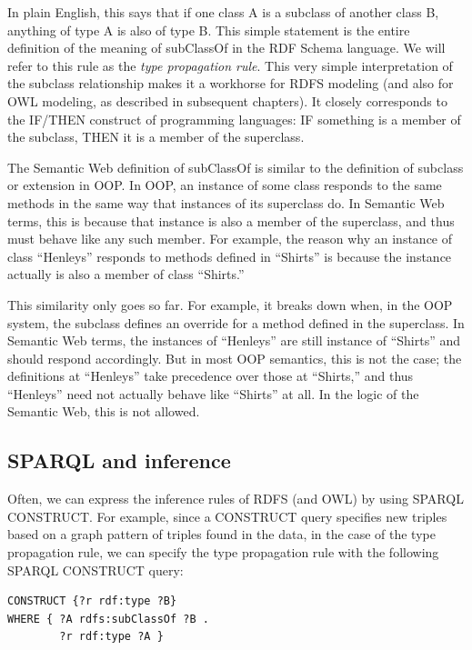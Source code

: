 In plain English, this says that if one class A is a subclass of another
class B, anything of type A is also of type B. This simple statement is
the entire definition of the meaning of subClassOf in the RDF Schema
language. We will refer to this rule as the \emph{type propagation
rule}. This very simple interpretation of the subclass relationship
makes it a workhorse for RDFS modeling (and also for OWL modeling, as
described in subsequent chapters). It closely corresponds to the IF/THEN
construct of programming languages: IF something is a member of the
subclass, THEN it is a member of the superclass.

\begin{sidebar}{}
The Semantic Web definition of subClassOf is similar to the definition
of subclass or extension in OOP. In OOP, an instance of some class
responds to the same methods in the same way that instances of its
superclass do. In Semantic Web terms, this is because that instance is
also a member of the superclass, and thus must behave like any such
member. For example, the reason why an instance of class ``Henleys''
responds to methods defined in ``Shirts'' is because the instance
actually is also a member of class ``Shirts.''

This similarity only goes so far. For example, it breaks down when, in
the OOP system, the subclass defines an override for a method defined in
the superclass. In Semantic Web terms, the instances of ``Henleys'' are
still instance of ``Shirts'' and should respond accordingly. But in most
OOP semantics, this is not the case; the definitions at ``Henleys'' take
precedence over those at ``Shirts,'' and thus ``Henleys'' need not
actually behave like ``Shirts'' at all. In the logic of the Semantic
Web, this is not allowed.
\end{sidebar}

\subsection{SPARQL and inference}

Often, we can express the inference rules of RDFS (and OWL) by using
SPARQL CONSTRUCT. For example, since a CONSTRUCT query specifies new
triples based on a graph pattern of triples found in
the data, in the case of the type propagation rule, we can specify the
type propagation rule with the following SPARQL CONSTRUCT query:

\begin{lstlisting}
CONSTRUCT {?r rdf:type ?B}
WHERE { ?A rdfs:subClassOf ?B .
        ?r rdf:type ?A }
\end{lstlisting}

